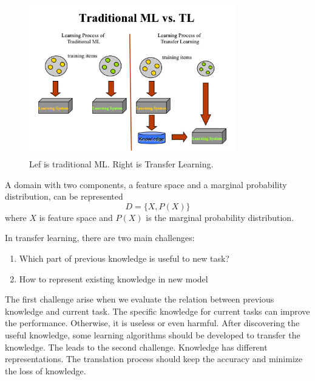 \graphicspath{ {./Figures/} }
\begin{figure}[!htb]
\centering
\includegraphics[width=0.8\textwidth]{MLvsTL.png}
\caption{\label{fig:perceptron}Lef is traditional ML. Right is Transfer Learning.}
\end{figure}

A domain with two components, a feature space and a marginal probability distribution, can be represented
\begin{equation}\label{eq:TransLearning}
D = \{ X, P(X) \}
\end{equation}
where $X$ is feature space and $P(X)$ is the marginal probability distribution. 

In transfer learning, there are two main challenges: 
\begin{enumerate}
  \item Which part of previous knowledge is useful to new task?
  \item How to represent existing knowledge in new model
\end{enumerate}
The first challenge arise when we evaluate the relation between previous knowledge and current task. The specific knowledge for current tasks can improve the performance. Otherwise, it is useless or even harmful. After discovering the useful knowledge, some learning algorithms should be developed to transfer the knowledge. The leads to the second challenge. Knowledge has different representations. The translation process should keep the accuracy and minimize the loss of knowledge. 